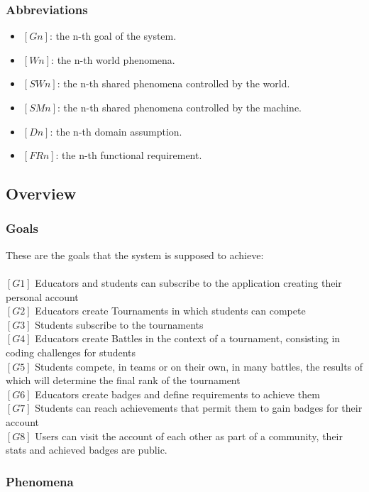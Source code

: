 \documentclass{article}
\begin{document}
\subsubsection{Abbreviations}
\begin{itemize}
    \item \textbf{$[Gn]$}: the n-th goal of the system.
    \item \textbf{$[Wn]$}: the n-th world phenomena.
    \item \textbf{$[SWn]$}: the n-th shared phenomena controlled by the world.
    \item \textbf{$[SMn]$}: the n-th shared phenomena controlled by the machine.
    \item \textbf{$[Dn]$}: the n-th domain assumption.
    \item \textbf{$[FRn]$}: the n-th functional requirement.
\end{itemize}

\subsection{Overview}
\subsubsection{Goals}
These are the goals that the system is supposed to achieve:\\\\
$[G1]$ Educators and students can subscribe to the application creating their personal account \\
$[G2]$ Educators create Tournaments in which students can compete \\
$[G3]$ Students subscribe to the tournaments \\
$[G4]$ Educators create Battles in the context of a tournament, consisting in coding challenges for students\\
$[G5]$ Students compete, in teams or on their own, in many battles, the results of which will determine the final rank of the tournament  \\
$[G6]$ Educators create badges and define requirements to achieve them\\
$[G7]$ Students can reach achievements that permit them to gain badges for their account\\
$[G8]$ Users can visit the account of each other as part of a community, their stats and achieved badges are public.
\newpage
      \subsubsection{Phenomena}
\end{document}

